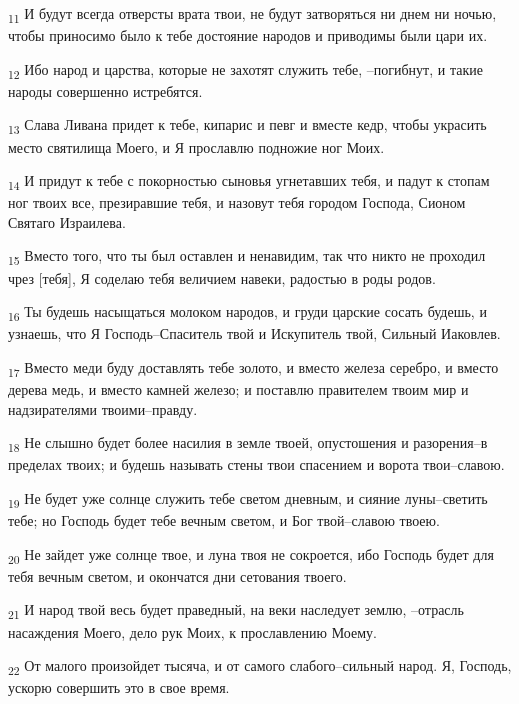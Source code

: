 \begin{tcolorbox}
\textsubscript{11} И будут всегда отверсты врата твои, не будут затворяться ни днем ни ночью, чтобы приносимо было к тебе достояние народов и приводимы были цари их.
\end{tcolorbox}
\begin{tcolorbox}
\textsubscript{12} Ибо народ и царства, которые не захотят служить тебе, --погибнут, и такие народы совершенно истребятся.
\end{tcolorbox}
\begin{tcolorbox}
\textsubscript{13} Слава Ливана придет к тебе, кипарис и певг и вместе кедр, чтобы украсить место святилища Моего, и Я прославлю подножие ног Моих.
\end{tcolorbox}
\begin{tcolorbox}
\textsubscript{14} И придут к тебе с покорностью сыновья угнетавших тебя, и падут к стопам ног твоих все, презиравшие тебя, и назовут тебя городом Господа, Сионом Святаго Израилева.
\end{tcolorbox}
\begin{tcolorbox}
\textsubscript{15} Вместо того, что ты был оставлен и ненавидим, так что никто не проходил чрез [тебя], Я соделаю тебя величием навеки, радостью в роды родов.
\end{tcolorbox}
\begin{tcolorbox}
\textsubscript{16} Ты будешь насыщаться молоком народов, и груди царские сосать будешь, и узнаешь, что Я Господь--Спаситель твой и Искупитель твой, Сильный Иаковлев.
\end{tcolorbox}
\begin{tcolorbox}
\textsubscript{17} Вместо меди буду доставлять тебе золото, и вместо железа серебро, и вместо дерева медь, и вместо камней железо; и поставлю правителем твоим мир и надзирателями твоими--правду.
\end{tcolorbox}
\begin{tcolorbox}
\textsubscript{18} Не слышно будет более насилия в земле твоей, опустошения и разорения--в пределах твоих; и будешь называть стены твои спасением и ворота твои--славою.
\end{tcolorbox}
\begin{tcolorbox}
\textsubscript{19} Не будет уже солнце служить тебе светом дневным, и сияние луны--светить тебе; но Господь будет тебе вечным светом, и Бог твой--славою твоею.
\end{tcolorbox}
\begin{tcolorbox}
\textsubscript{20} Не зайдет уже солнце твое, и луна твоя не сокроется, ибо Господь будет для тебя вечным светом, и окончатся дни сетования твоего.
\end{tcolorbox}
\begin{tcolorbox}
\textsubscript{21} И народ твой весь будет праведный, на веки наследует землю, --отрасль насаждения Моего, дело рук Моих, к прославлению Моему.
\end{tcolorbox}
\begin{tcolorbox}
\textsubscript{22} От малого произойдет тысяча, и от самого слабого--сильный народ. Я, Господь, ускорю совершить это в свое время.
\end{tcolorbox}
